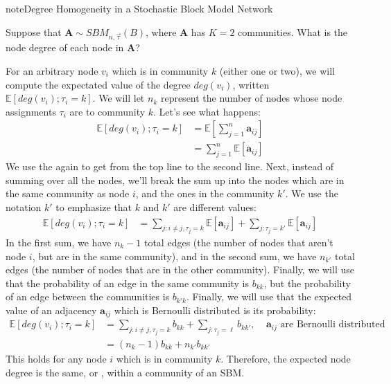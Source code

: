 \documentclass[letterpaper,10pt,english]{jupyterBook}
\begin{document}
\begin{sphinxadmonition}{note}{Degree Homogeneity in a Stochastic Block Model Network}

\sphinxAtStartPar
Suppose that \(\mathbf A \sim SBM_{n, \vec\tau}(B)\), where \(\mathbf A\) has \(K=2\) communities. What is the node degree of each node in \(\mathbf A\)?

\sphinxAtStartPar
For an arbitrary node \(v_i\) which is in community \(k\) (either one or two), we will compute the expectated value of the degree \(deg(v_i)\), written \(\mathbb E\left[deg(v_i); \tau_i = k\right]\). We will let \(n_k\) represent the number of nodes whose node assignments \(\tau_i\) are to community \(k\). Let’s see what happens:
\begin{align*}
    \mathbb E\left[deg(v_i); \tau_i = k\right] &= \mathbb E\left[\sum_{j = 1}^n \mathbf a_{ij}\right] \\
    &= \sum_{j = 1}^n \mathbb E[\mathbf a_{ij}]
\end{align*}
\sphinxAtStartPar
We use the  again to get from the top line to the second line. Next, instead of summing over all the nodes, we’ll break the sum up into the nodes which are in the same community as node \(i\), and the ones in the  community \(k'\). We use the notation \(k'\) to emphasize that \(k\) and \(k'\) are different values:
\begin{align*}
    \mathbb E\left[deg(v_i); \tau_i = k\right] &= \sum_{j : i \neq j, \tau_j = k} \mathbb E\left[\mathbf a_{ij}\right] + \sum_{j : \tau_j =k'} \mathbb E[\mathbf a_{ij}]
\end{align*}
\sphinxAtStartPar
In the first sum, we have \(n_k-1\) total edges (the number of nodes that aren’t node \(i\), but are in the same community), and in the second sum, we have \(n_{k'}\) total edges (the number of nodes that are in the other community). Finally, we will use that the probability of an edge in the same community is \(b_{kk}\), but the probability of an edge between the communities is \(b_{k' k}\). Finally, we will use that the expected value of an adjacency \(\mathbf a_{ij}\) which is Bernoulli distributed is its probability:
\begin{align*}
    \mathbb E\left[deg(v_i); \tau_i = k\right] &= \sum_{j : i \neq j, \tau_j = k} b_{kk} + \sum_{j : \tau_j = \ell} b_{kk'},\;\;\;\;\mathbf a_{ij}\textrm{ are Bernoulli distributed} \\
    &= (n_k - 1)b_{kk} + n_{k'} b_{kk'}
\end{align*}
\sphinxAtStartPar
This holds for any node \(i\) which is in community \(k\). Therefore, the expected node degree is the same, or , within a community of an SBM.
\end{sphinxadmonition}
\end{document}
